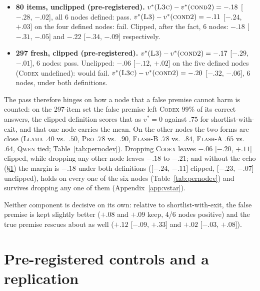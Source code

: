 \documentclass[11pt]{article}
\begin{document}
\begin{itemize}\itemsep0pt
\item \textbf{80 items, unclipped (pre-registered).} $v^\ast(\textsc{L3c})-v^\ast(\textsc{cond2})=-.18$ [$-.28$, $-.02$], all 6 nodes defined: pass. $v^\ast(\textsc{L3})-v^\ast(\textsc{cond2})=-.11$ [$-.24$, $+.03$] on the four defined nodes: fail. Clipped, after the fact, 6 nodes: $-.18$ [$-.31$, $-.05$] and $-.22$ [$-.34$, $-.09$] respectively.
\item \textbf{297 fresh, clipped (pre-registered).} $v^\ast(\textsc{L3})-v^\ast(\textsc{cond2})=-.17$ [$-.29$, $-.01$], 6 nodes: pass. Unclipped: $-.06$ [$-.12$, $+.02$] on the five defined nodes (\textsc{Codex} undefined): would fail. $v^\ast(\textsc{L3c})-v^\ast(\textsc{cond2})=-.20$ [$-.32$, $-.06$], 6 nodes, under both definitions.
\end{itemize}

The pass therefore hinges on how a node that a false premise cannot harm is counted: on the 297-item set the false premise left \textsc{Codex} 99\% of its correct answers, the clipped definition scores that as $v^\ast=0$ against $.75$ for shortlist-with-exit, and that one node carries the mean. On the other nodes the two forms are close (\textsc{Llama} $.40$ vs.\ $.50$, \textsc{Pro} $.78$ vs.\ $.90$, \textsc{Flash-B} $.78$ vs.\ $.84$, \textsc{Flash-A} $.65$ vs.\ $.64$, \textsc{Qwen} tied; Table~\ref{tab:pernodev}). Dropping \textsc{Codex} leaves $-.06$ [$-.20$, $+.11$] clipped, while dropping any other node leaves $-.18$ to $-.21$; and without the echo (\S\ref{sec:controls}) the margin is $-.18$ under both definitions ([$-.24$, $-.11$] clipped, [$-.23$, $-.07$] unclipped), holds on every one of the six nodes (Table~\ref{tab:pernodev}) and survives dropping any one of them (Appendix~\ref{app:vstar}).

Neither component is decisive on its own: relative to shortlist-with-exit, the false premise is kept slightly better ($+.08$ and $+.09$ keep, 4/6 nodes positive) and the true premise rescues about as well ($+.12$ [$-.09$, $+.33$] and $+.02$ [$-.03$, $+.08$]).

\section{Pre-registered controls and a replication}
\label{sec:controls}
\end{document}
